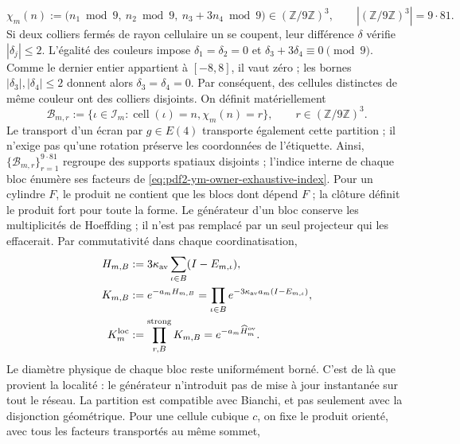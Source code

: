 \begin{equation}\label{eq:pdf2-ym-owner-729-coloring}
 \chi_m(n):=
 \bigl(n_1\bmod9,\ n_2\bmod9,\ n_3+3n_4\bmod9\bigr)
 \in(\mathbb Z/9\mathbb Z)^3,
 \qquad |(\mathbb Z/9\mathbb Z)^3|=9\cdot81.
\end{equation}
Si deux colliers fermés de rayon cellulaire un se coupent, leur différence
$\delta$ vérifie $|\delta_j|\le2$. L’égalité des couleurs impose
$\delta_1=\delta_2=0$ et
$\delta_3+3\delta_4\equiv0\pmod9$. Comme le dernier entier appartient à
$[-8,8]$, il vaut zéro ; les bornes $|\delta_3|,|\delta_4|\le2$ donnent alors
$\delta_3=\delta_4=0$. Par conséquent, des cellules distinctes de même couleur ont
des colliers disjoints. On définit matériellement
\begin{equation}\label{eq:pdf2-ym-owner-729-blocks}
 \mathcal B_{m,r}:=\{\iota\in\mathcal I_m:
   \operatorname{cell}(\iota)=n, \chi_m(n)=r\},
 \qquad r\in(\mathbb Z/9\mathbb Z)^3.
\end{equation}
Le transport d'un écran par $g\in E(4)$ transporte également cette partition ; il n'exige pas qu'une rotation préserve les coordonnées de l'étiquette. Ainsi, $\{\mathcal B_{m,r}\}_{r=1}^{9\cdot81}$ regroupe des supports spatiaux disjoints ; l'indice interne de chaque bloc énumère ses facteurs de \eqref{eq:pdf2-ym-owner-exhaustive-index}. Pour un cylindre $F$, le produit ne contient que les blocs dont dépend $F$ ; la clôture définit le produit fort pour toute la forme. Le générateur d'un bloc conserve les multiplicités de Hoeffding ; il n'est pas remplacé par un seul projecteur qui les effacerait. Par commutativité dans chaque coordinatisation,
\begin{equation}\label{eq:pdf2-ym-owner-local-circuit}
\begin{aligned}
 H_{m,B}&:=3\kappa_{\rm av}\sum_{\iota\in B}(I-E_{m,\iota}),\\
 K_{m,B}&:=e^{-a_mH_{m,B}}
 =\prod_{\iota\in B}e^{-3\kappa_{\rm av}a_m(I-E_{m,\iota})},\\
 K_m^{\rm loc}&:=\mathop{\prod_{r,B}}^{\rm strong}K_{m,B}
 =e^{-a_m\widehat H_m^{\rm ov}}.
\end{aligned}
\end{equation}
Le diamètre physique de chaque bloc reste uniformément borné. C'est de là que provient la localité : le générateur n'introduit pas de mise à jour instantanée sur tout le réseau.
La partition est compatible avec Bianchi, et pas seulement avec la disjonction géométrique. Pour une cellule cubique $c$, on fixe le produit orienté, avec tous les facteurs transportés au même sommet,
